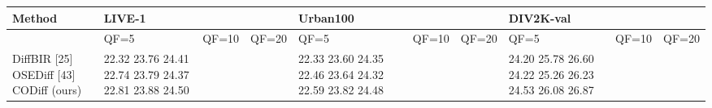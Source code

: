 \begin{tabular}{llllllllll}
\toprule
Method & LIVE-1 &  &  & Urban100 &  &  & DIV2K-val &  &  \\
\midrule
 & QF=5 & QF=10 & QF=20 & QF=5 & QF=10 & QF=20 & QF=5 & QF=10 & QF=20 \\
DiffBIR [25] OSEDiff [43] CODiff (ours) & 22.32 23.76 24.41 22.74 23.79 24.37 22.81 23.88 24.50 &  &  & 22.33 23.60 24.35 22.46 23.64 24.32 22.59 23.82 24.48 &  &  & 24.20 25.78 26.60 24.22 25.26 26.23 24.53 26.08 26.87 &  &  \\
\bottomrule
\end{tabular}
